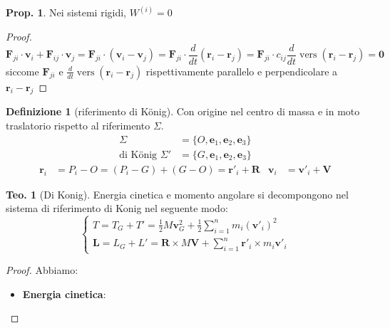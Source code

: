\documentclass[a4paper,10pt]{article}
\theoremstyle{definition}
\DeclareMathOperator*{\vers}{vers}
\newcommand{\bv}{\boldsymbol} %
\theoremstyle{indentdefinition}
\newtheorem{defn}{Definizione}[section]
\theoremstyle{indenttheorem}
\newtheorem{thm}{Teo.}
\newtheorem{prop}{Prop.}
\theoremstyle{myremark}
\theoremstyle{indentgeneral}
\newenvironment{myboxed} 
{\noindent\begin{lrbox}{\mybox}\begin{minipage}{\textwidth}}
{\end{minipage}\end{lrbox}\fbox{\usebox{\mybox}}}
\begin{document}
\begin{prop}
Nei sistemi rigidi, $W^{\left(i\right)}=0$
\end{prop}

\begin{proof}
\[
\boldsymbol{F}_{ji}\cdot\boldsymbol{v}_{i}+\boldsymbol{F}_{ij}\cdot\boldsymbol{v}_{j}=\boldsymbol{F}_{ji}\cdot\left(\boldsymbol{v}_{i}-\boldsymbol{v}_{j}\right)=\boldsymbol{F}_{ji}\cdot\frac{d}{dt}\left(\boldsymbol{r}_{i}-\boldsymbol{r}_{j}\right)=\boldsymbol{F}_{ji}\cdot c_{ij}\frac{d}{dt}\vers\left(\boldsymbol{r}_{i}-\boldsymbol{r}_{j}\right)=\boldsymbol{0}
\]
siccome $\boldsymbol{F}_{ji}$ e $\frac{d}{dt}\vers\left(\boldsymbol{r}_{i}-\boldsymbol{r}_{j}\right)$
rispettivamente parallelo e perpendicolare a $\boldsymbol{r}_{i}-\boldsymbol{r}_{j}$
\end{proof}
\begin{defn}[riferimento di König]
\label{def:riferimento-Konig}Con origine nel centro di massa
e in moto traslatorio rispetto al riferimento $\Sigma$.
\begin{align*}
    \Sigma&=\{O, \bv{e}_1,\bv{e}_2,\bv{e}_3\} \\
   \text{di König } \Sigma'&=\{G, \bv{e}_1,\bv{e}_2,\bv{e}_3\}
\end{align*}
\begin{align*}
\boldsymbol{r}_{i} & =P_{i}-O=\left(P_{i}-G\right)+\left(G-O\right)=\boldsymbol{r}'_{i}+\boldsymbol{R} & \boldsymbol{v}_{i} & =\boldsymbol{v}'_{i}+\boldsymbol{V}
\end{align*}

\begin{myboxed}
    \begin{thm}[Di Konig] Energia cinetica e momento angolare si decompongono nel sistema di riferimento di Konig nel seguente modo:
    $$\begin{cases}
    T=T_G+T'= \frac{1}{2}M\boldsymbol{v}_{G}^{2}+\frac{1}{2}\sum_{i=1}^{n}m_{i}\left(\boldsymbol{v}'_{i}\right)^{2}\\
    \bv{L}=L_G+L'=\boldsymbol{R}\times M\boldsymbol{V}+\sum_{i=1}^{n}\boldsymbol{r}'_{i}\times m_{i}\boldsymbol{v}'_{i}
\end{cases}$$
    \end{thm}
\end{myboxed}
\begin{proof} Abbiamo:
\begin{itemize}
    \item \textbf{Energia cinetica}:


\end{itemize}
\end{proof}
\end{defn}
\end{document}

